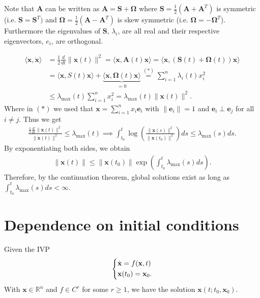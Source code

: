 \begin{remark}[]
	Note that $\bm{A} $ can be written as $\bm{A}=\bm{S} +\bm{\Omega }$ where $\bm{S} = \frac{1}{2}(\bm{A} + \bm{A}^T)$ is symmetric (i.e. $\bm{S} = \bm{S}^T)$ and $\bm{\Omega} = \frac{1}{2}(\bm{A} - \bm{A}^T)$ is skew symmetric (i.e. $\bm{\Omega} = -\bm{\Omega}^T$). Furthermore the eigenvalues of $\bm{S}$, $\lambda_i$, are all real and their respective eigenvectors, $e_i$, are orthogonal.
\end{remark}

\begin{ex}
\begin{align}
	\langle  \textbf{x}, \dot{ \textbf{x}} \rangle &= \frac{1}{2} \frac{d}{dt}  \| \textbf{x}(t) \|^2 = \langle  \textbf{x}, \bm{A}(t)  \textbf{x}\rangle = \langle  \textbf{x}, (\bm{S}(t) + \bm{\Omega}(t) )  \textbf{x} \rangle \\
				   &= \langle  \textbf{x}, S(t)  \textbf{x} \rangle + \underbrace{\langle  \textbf{x}, \bm{\Omega}(t)  \textbf{x} \rangle}_{=0} \stackrel{(*)}{=} 
				   \sum_{i=1}^{n} \lambda_i(t) x_i^2 \\
				   &\leq \lambda_{ \textrm{max} }(t) \sum_{i=1}^{n} x_i^2 = \lambda _{ \textrm{max} }(t)  \|  \textbf{x}(t) \|^2.
\end{align}
Where in $(*)$ we used that $ \textbf{x} = \sum_{i=1}^{n} x_i  \textbf{e}_i $ with $ \| \textbf{e}_i \|=1$ and $ \textbf{e}_i \perp  \textbf{e}_j$ for all $i \neq j$. Thus we get
\begin{align}
	\frac{\frac{1}{2}\frac{d}{dt} \| \textbf{x}(t) \|^2}{ \| \textbf{x}(t) \|^2} \leq \lambda_{ \textrm{max} }(t) 
	\implies \int_{t_0}^{t} \log \left( \frac{ \| \textbf{x}(s) \|^2}{ \| \textbf{x}(t_0) \|^2} \right) ds \leq \lambda _{ \textrm{max} }(s) ds.
\end{align}
By exponentiating both sides, we obtain
\begin{align}
\boxed{  \| \textbf{x}(t) \| \leq  \| \textbf{x}(t_0)  \| \exp\left(\int_{t_0}^{t} \lambda_{ \textrm{max} }(s)ds\right).}
\end{align}
Therefore, by the continuation theorem, global solutions exist as long as $\int_{t_0}^{t} \lambda_{ \textrm{max} }(s) ds < \infty $.
\end{ex}

\section{Dependence on initial conditions}
Given the IVP
\begin{align}
	\begin{dcases}
	\dot{ \textbf{x}} = f( \textbf{x},t) \\  \textbf{x}(t_0) =  \textbf{x}_0.
	\end{dcases}
\end{align}
With $ \textbf{x} \in \mathbb{R}^{n}$ and $f\in C^r$ for some $r\geq 1$, we have the solution $ \textbf{x}(t; t_0,  \textbf{x}_0)$.

